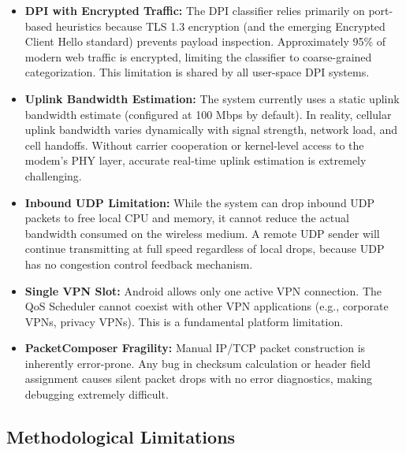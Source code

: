 \begin{itemize}
    \item \textbf{DPI with Encrypted Traffic:} The DPI classifier relies primarily on port-based heuristics because TLS 1.3 encryption (and the emerging Encrypted Client Hello standard) prevents payload inspection. Approximately 95\% of modern web traffic is encrypted, limiting the classifier to coarse-grained categorization. This limitation is shared by all user-space DPI systems.
    
    \item \textbf{Uplink Bandwidth Estimation:} The system currently uses a static uplink bandwidth estimate (configured at 100 Mbps by default). In reality, cellular uplink bandwidth varies dynamically with signal strength, network load, and cell handoffs. Without carrier cooperation or kernel-level access to the modem's PHY layer, accurate real-time uplink estimation is extremely challenging.
    
    \item \textbf{Inbound UDP Limitation:} While the system can drop inbound UDP packets to free local CPU and memory, it cannot reduce the actual bandwidth consumed on the wireless medium. A remote UDP sender will continue transmitting at full speed regardless of local drops, because UDP has no congestion control feedback mechanism.
    
    \item \textbf{Single VPN Slot:} Android allows only one active VPN connection. The QoS Scheduler cannot coexist with other VPN applications (e.g., corporate VPNs, privacy VPNs). This is a fundamental platform limitation.
    
    \item \textbf{PacketComposer Fragility:} Manual IP/TCP packet construction is inherently error-prone. Any bug in checksum calculation or header field assignment causes silent packet drops with no error diagnostics, making debugging extremely difficult.
\end{itemize}

\subsection{Methodological Limitations}

